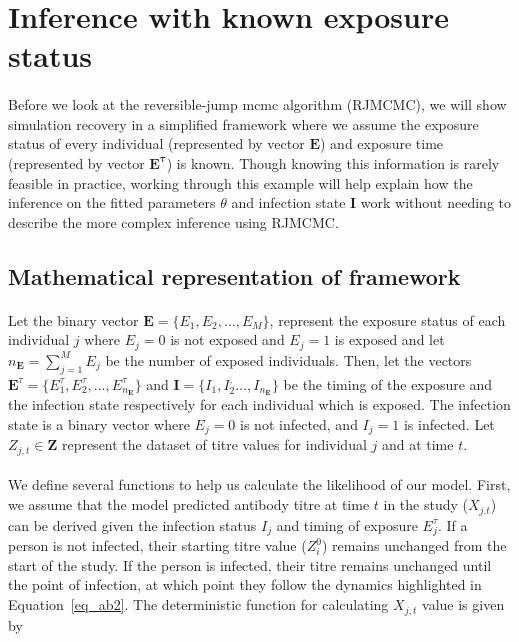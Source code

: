 

\section{Inference with known exposure status}

\paragraph{}Before we look at the reversible-jump mcmc algorithm (RJMCMC), we will show simulation recovery in a simplified framework where we assume the exposure status of every individual (represented by vector $\mathbf{E}$) and exposure time (represented by vector $\mathbf{E^\tau}$) is known. Though knowing this information is rarely feasible in practice, working through this example will help explain how the inference on the fitted parameters $\theta$ and infection state $\mathbf{I}$ work without needing to describe the more complex inference using RJMCMC. 

\subsection{Mathematical representation of framework}

\paragraph{}Let the binary vector $\mathbf{E} = \{ E_1, E_2, \dots, E_M\}$, represent the exposure status of each individual $j$ where $E_j = 0$ is not exposed and $E_j = 1$ is exposed and let $n_\mathbf{E} = \sum_{j = 1}^ME_j$ be the number of exposed individuals. Then, let the vectors $\mathbf{E}^\tau = \{E_1^\tau, E_2^\tau, \dots, E^\tau_{n_\mathbf{E}}\}$ and $\mathbf{I} = \{I_1, I_2^, \dots, I_{n_\mathbf{E}}\}$ be the timing of the exposure and the infection state respectively for each individual which is exposed. The infection state is a binary vector where $E_j = 0$ is not infected, and $I_j = 1$ is infected. Let $Z_{j, t} \in \mathbf{Z}$ represent the dataset of titre values for individual $j$ and at time $t$. 

\paragraph{}We define several functions to help us calculate the likelihood of our model. First, we assume that the model predicted antibody titre at time $t$ in the study ($X_{j.t}$) can be derived given the infection status $I_j$ and timing of exposure $E_j^\tau$. If a person is not infected, their starting titre value ($Z^0_i$) remains unchanged from the start of the study. If the person is infected, their titre remains unchanged until the point of infection, at which point they follow the dynamics highlighted in Equation~\ref{eq_ab2}. The deterministic function for calculating $X_{j,t}$ value is given by

